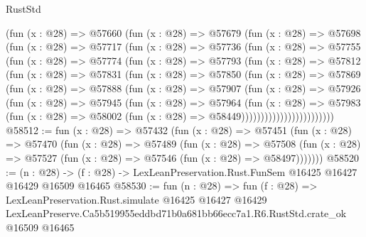 \begin{lexlean}{RustStd}
\begin{coremodule}
            (fun (x : @28) =>
            @57660
              (fun (x : @28) =>
              @57679
                (fun (x : @28) =>
                @57698
                  (fun (x : @28) =>
                  @57717
                    (fun (x : @28) =>
                    @57736
                      (fun (x : @28) =>
                      @57755
                        (fun (x : @28) =>
                        @57774
                          (fun (x : @28) =>
                          @57793
                            (fun (x : @28) =>
                            @57812
                              (fun (x : @28) =>
                              @57831
                                (fun (x : @28) =>
                                @57850
                                  (fun (x : @28) =>
                                  @57869
                                    (fun (x : @28) =>
                                    @57888
                                      (fun (x : @28) =>
                                      @57907
                                        (fun (x : @28) =>
                                        @57926
                                          (fun (x : @28) =>
                                          @57945
                                            (fun (x : @28) =>
                                            @57964
                                              (fun (x : @28) =>
                                              @57983
                                                (fun (x : @28) =>
                                                @58002
                                                  (fun (x : @28) => @58449))))))))))))))))))))))))
@58512 := fun (x : @28) =>
  @57432
    (fun (x : @28) =>
    @57451
      (fun (x : @28) =>
      @57470
        (fun (x : @28) =>
        @57489
          (fun (x : @28) =>
          @57508 (fun (x : @28) => @57527 (fun (x : @28) => @57546 (fun (x : @28) => @58497)))))))
@58520 := (n : @28) ->
  (f : @28) -> LexLeanPreservation.Rust.FunSem @16425 @16427 @16429 @16509 @16465
@58530 := fun (n : @28) =>
  fun (f : @28) =>
  LexLeanPreservation.Rust.simulate
    @16425
    @16427
    @16429
    LexLeanPreserve.Ca5b519955eddbd71b0a681bb66ecc7a1.R6.RustStd.crate_ok
    @16509
    @16465
\end{coremodule}
\end{lexlean}
